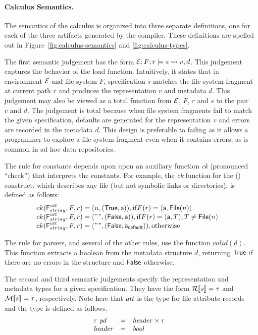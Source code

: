 \paragraph*{Calculus Semantics.}
%
The semantics of the calculus is organized into three separate
definitions, one for each of the three artifacts generated by the
\forest{} compiler. These definitions are spelled out in
Figure~\ref{fig:calculus-semantics} and \ref{fig:calculus-types}.

The first semantic judgement has the form $\mathcal{E};F;r \models s \rightsquigarrow
v,d$.  This judgement captures the behavior of the load function.
Intuitively, it states that in environment $\mathcal{E}$ and file system $F$,
specification $s$ matches the file system fragment at current path $r$
and produces the representation $v$ and metadata $d$.  This judgement
may also be viewed as a total function from $\mathcal{E}$, $F$, $r$ and $s$
to the pair $v$ and $d$.  The judgement is total because when file
system fragments fail to match the given specification, defaults are
generated for the representation $v$ and errors are recorded in the
metadata $d$.  This design is preferable to failing as it allows a
programmer to explore a file system fragment even when it contains
errors, as is common in ad hoc data repositories.

The rule for constants depends upon upon an auxiliary function 
{\it ck} (pronounced ``check'') that interprets the constants.  For
example, the {\it ck} function for the (\pfile) construct, which
describes any file (but not symbolic links or directories), is defined
as follows:
\[
\begin{array}{@{}l}
ck(\mbox{\sf F}^{\metapdty}_{\stringty},F,r) = (n,(\True,\att)), \mathrm{if } F(r) = (\att,\File{n}) \\
ck(\mbox{\sf F}^{\metapdty}_{\stringty},F,r) = ("",(\False,\att)), \mathrm{if } F(r) = (\att,T), T \not=\File{n} \\
ck(\mbox{\sf F}^{\metapdty}_{\stringty},F,r) = ("",(\False,\defaultatt)), \mathrm{otherwise}
\end{array}
\]

The rule for \padshaskell{} parsers, and several of the other rules,
use the function $valid(d)$.  This function extracts a boolean from
the metadata structure $d$, returning $\mathsf{True}$ if there are no errors
in the structure and $\mathsf{False}$ otherwise. 

The second and third semantic judgements specify the representation
and metadata types for a given specification.  They have the form
${\cal R}[\![ s ]\!] = \tau$ and ${\cal M}[\![ s ]\!] = \tau$, respectively.  Note here
that $\mathit{att}$ is the type for file attribute records and the 
 type is defined as follows.
\[
\begin{array}{lcl}
\tau~\mathit{pd} & = & \mathit{header} \times \tau \\
\mathit{header} & = & \mathit{bool} 
\end{array}
\]

